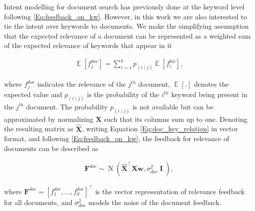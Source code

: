 \documentclass[dissertation,math,vertlayout,pdfa,colorlinks]{aaltoseries}
\newcommand{\bw}{\bm{w}}
\DeclareMathOperator{\eye}{\textbf{I}}
\DeclareMathOperator{\normalpdf}{N}
\DeclareMathOperator{\E}{\mathbb{E}}
\newcommand{\tp}{^{\top}}
\begin{document}
Intent modelling for document search has previously done at the keyword level \cite{Ruotsalo2018} following \ref{Eq:feedback_on_kw}. However, in this work we are also interested to tie the intent over keywords to documents. We make the simplifying assumption that the expected relevance of a document can be represented as a weighted sum of the expected relevance of keywords that appear in it

\begin{align}\label{Eq:doc_key_relation} 
 \E[f_{j}^{doc}] = \sum_{i=1}^{k} p_{(i \mid j)}  \E[f_{i}^{kw}],
\end{align}

\noindent where $f_{j}^{doc}$ indicates the relevance of the $j^{th}$ document, $\E[.]$ denotes the expected value and $p_{(i \mid j)}$ is the probability of the $i^{th}$ keyword being present in the $j^{th}$ document. The probability $p_{(i \mid j)}$ is not available but can be approximated by normalizing $\bm{X}$ such that its columns sum up to one. Denoting the resulting matrix as $\hat{\bm{X}}$, writing Equation \ref{Eq:doc_key_relation} in vector format, and following  \ref{Eq:feedback_on_kw}, the feedback for relevance of documents can be described as 

\begin{align}\label{Eq:doc_key_relation_vector} 
\bm{F}^{doc} \sim \normalpdf(  \hat{\bm{X}}\tp \bm{X} \bw, \sigma_{doc}^2 \eye),
\end{align}  

\noindent where $\bm{F}^{doc}=[f_{1}^{doc},\ldots,f_{d}^{doc}]\tp$ is the vector representation of relevance feedback for all documents, and $\sigma_{doc}^2$ models the noise of the document feedback. 
\end{document}
